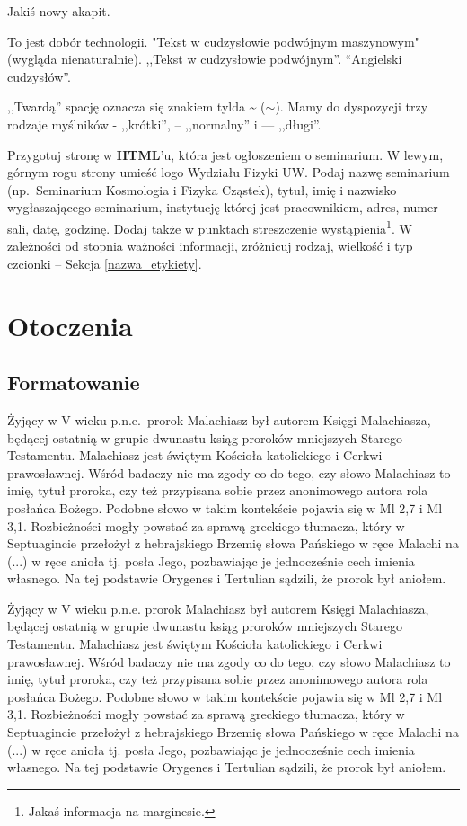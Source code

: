 \documentclass[12pt,a4paper]{article}
\begin{document}
Jakiś nowy akapit.



To jest dobór technologii.
"Tekst w cudzysłowie podwójnym maszynowym" (wygląda nienaturalnie).
,,Tekst w cudzysłowie podwójnym''. ``Angielski cudzysłów''.

,,Twardą'' spację oznacza się znakiem tylda \~{} ($\sim$).
Mamy do dyspozycji trzy rodzaje myślników - ,,krótki'', -- ,,normalny'' i --- ,,długi''.

\label{nazwa_etykiety}

Przygotuj stronę w \textbf{HTML}'u, która jest ogłoszeniem o seminarium.
W lewym, górnym rogu strony umieść logo Wydziału Fizyki UW.
Podaj nazwę seminarium (np.~Seminarium Kosmologia i Fizyka Cząstek),
tytuł, imię i nazwisko  wygłaszającego seminarium,
instytucję której jest pracownikiem,
adres, numer sali, datę, godzinę.
 Dodaj także w punktach streszczenie wystąpienia\footnote{Jakaś informacja na marginesie.}.
 W zależności od stopnia ważności informacji, zróżnicuj rodzaj,
wielkość i typ czcionki -- Sekcja \ref{nazwa_etykiety}.

\section{Otoczenia}

\subsection{Formatowanie}

Żyjący w V wieku p.n.e.~prorok Malachiasz był autorem Księgi Malachiasza, będącej
ostatnią w grupie dwunastu ksiąg proroków mniejszych Starego Testamentu. Malachiasz jest
świętym Kościoła katolickiego i Cerkwi prawosławnej. Wśród badaczy nie ma zgody co do
tego, czy słowo Malachiasz to imię, tytuł proroka, czy też przypisana sobie przez
anonimowego autora rola posłańca Bożego. Podobne słowo w takim kontekście pojawia
się w Ml 2,7 i Ml 3,1. Rozbieżności mogły powstać za sprawą greckiego tłumacza, który
w Septuagincie przełożył z hebrajskiego Brzemię słowa Pańskiego w ręce Malachi na
(...) w ręce anioła tj. posła Jego, pozbawiając je jednocześnie cech
imienia własnego. Na tej podstawie Orygenes i Tertulian sądzili, że prorok był aniołem.

\begin{center}
Żyjący w V wieku p.n.e. prorok Malachiasz był autorem Księgi Malachiasza, będącej
ostatnią w grupie dwunastu ksiąg proroków mniejszych Starego Testamentu. Malachiasz jest
świętym Kościoła katolickiego i Cerkwi prawosławnej. Wśród badaczy nie ma zgody co do
tego, czy słowo Malachiasz to imię, tytuł proroka, czy też przypisana sobie przez
anonimowego autora rola posłańca Bożego. Podobne słowo w takim kontekście pojawia
się w Ml 2,7 i Ml 3,1. Rozbieżności mogły powstać za sprawą greckiego tłumacza, który
w Septuagincie przełożył z hebrajskiego Brzemię słowa Pańskiego w ręce Malachi na
(...) w ręce anioła tj. posła Jego, pozbawiając je jednocześnie cech
imienia własnego. Na tej podstawie Orygenes i Tertulian sądzili, że prorok był aniołem.
\end{center}
\end{document}
